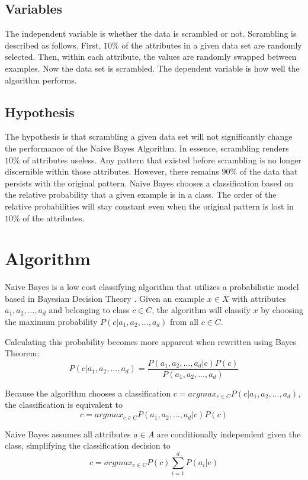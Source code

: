 \documentclass[twoside,11pt]{article}
\begin{document}
\subsection{Variables}

The independent variable is whether the data is scrambled or not. Scrambling is described as follows. First, $10\%$ of the attributes in a given data set are randomly selected. Then, within each attribute, the values are randomly swapped between examples. Now the data set is scrambled. The dependent variable is how well the algorithm performs.

\subsection{Hypothesis}

The hypothesis is that scrambling a given data set will not significantly change the performance of the Naive Bayes Algorithm. In essence, scrambling renders $10\%$ of attributes useless. Any pattern that existed before scrambling is no longer discernible within those attributes. However, there remains $90\%$ of the data that persists with the original pattern. Naive Bayes chooses a classification based on the relative probability that a given example is in a class. The order of the relative probabilities will stay constant even when the original pattern is lost in $10\%$ of the attributes.

\section{Algorithm}

Naive Bayes is a low cost classifying algorithm that utilizes a probabilistic model based in Bayesian Decision Theory \citep{nbPaper:2014}. Given an example $x \in X$ with attributes $a_1, a_2, ..., a_d$ and belonging to class $c \in C$, the algorithm will classify $x$ by choosing the maximum probability $P(c|a_1, a_2, ..., a_d)$ from all $c \in C$.

Calculating this probability becomes more apparent when rewritten using Bayes Theorem:
$$P(c|a_1, a_2, ..., a_d) = \frac{P(a_1, a_2, ..., a_d | c)P(c)}{P(a_1, a_2, ..., a_d)} $$

Because the algorithm chooses a classification $c = argmax_{c \in C}P(c|a_1, a_2, ..., a_d)$, the classification is equivalent to
$$c = argmax_{c \in C}P(a_1, a_2, ..., a_d | c)P(c)$$

Naive Bayes assumes all attributes $a \in A$ are conditionally independent given the class, simplifying the classification decision to 
$$c = argmax_{c \in C}P(c)\sum_{i = 1}^{d}P(a_i | e)$$
\end{document}

